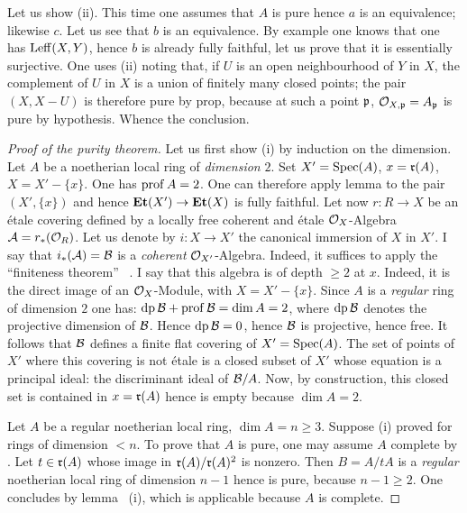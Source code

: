 Let us show (ii). This time one assumes that $A$ is pure hence $a$ is
an equivalence; likewise $c$. Let us see that $b$ is an equivalence. By
example  one knows that one has $\operatorname{Leff}(X, Y)$, hence $b$ is
already fully faithful, let us prove that it is essentially
surjective. One uses  (ii) noting that, if $U$ is an open
neighbourhood of $Y$ in $X$, the complement of $U$ in $X$ is a union of
finitely many closed points; the pair $(X,X-U)$ is therefore pure by
prop\ptbl {}, because at such a point $\mathfrak{p}$,
${\mathcal O}_{X,\mathfrak{p}}=A_{\mathfrak{p}}$ is pure by hypothesis. Whence the conclusion.

\begin{proof}[Proof of the purity theorem]
Let us first show (i) by induction on the dimension. Let $A$ be a
noetherian local ring of \emph{dimension} $2$. Set $X'=\operatorname{Spec}(A)$,
$x=\mathfrak{r}(A)$, $X=X'-\{x\}$. One has $\operatorname{prof} A=2$. One can therefore apply
lemma  to the pair $(X', \{x\})$ and hence
$\Et(X')\to\Et(X)$ is fully faithful. Let now $r\colon R\to X$ be an
\'etale covering defined by a locally free coherent and \'etale
$\mathcal{O}_X$-Algebra ${\mathcal A}=r_\ast({\mathcal O}_R)$. Let us denote by $i\colon X\to X'$
the canonical immersion of $X$ in $X'$. I say that $i_\ast({\mathcal A})={\mathcal B}$ is
a \emph{coherent} ${\mathcal O}_{X'}$-Algebra. Indeed, it suffices to apply the
``finiteness theorem'' ~. I say that this
algebra is of depth $\geq 2$ at $x$. Indeed, it is the direct image of
an $\mathcal{O}_X$-Module, with $X=X'-\{x\}$. Since $A$ is a \emph{regular} ring
of dimension $2$ one has: $\operatorname{dp} {\mathcal B} + \operatorname{prof}{\mathcal B}=\dim A=2$, where
$\operatorname{dp}{\mathcal B}$ denotes the projective dimension of ${\mathcal B}$. Hence
$\operatorname{dp}{\mathcal B}=0$, hence ${\mathcal B}$ is projective, hence free. It follows that
${\mathcal B}$ defines a finite flat covering of $X'=\operatorname{Spec}(A)$. The set of
points of $X'$ where this covering is not \'etale is a closed subset of
$X'$ whose equation is a principal ideal: the discriminant ideal of
${\mathcal B}/A$. Now, by construction, this closed set is contained in
$x=\mathfrak{r}(A)$ hence is empty because $\dim A=2$.

Let $A$ be a regular noetherian local ring, $\dim A=n\geq3$. Suppose
(i) proved for rings of dimension $<n$. To prove that $A$ is pure, one
may assume $A$ complete by . Let $t\in\mathfrak{r}(A)$ whose image in
$\mathfrak{r}(A)/\mathfrak{r}(A)^2$ is nonzero. Then $B=A/tA$ is a \emph{regular}
noetherian local ring of dimension $n-1$ hence is pure, because
$n-1\geq2$. One concludes by lemma ~(i), which is applicable
because $A$ is complete.


\end{proof}
